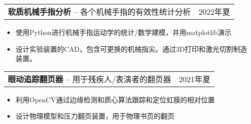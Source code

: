 \documentclass[oneside, 11pt]{article}
\newcommand*{\projectEntry}[3]{
	\noindent
	\begin{tabularx}{\textwidth}{Xr}
	\textbf{#1} -- #3 & #2
	\end{tabularx}
	\vspace{-1.25\baselineskip}
}
\newenvironment{expD}
	{\begin{itemize}[noitemsep,topsep=0pt]}
	{\end{itemize}}
\begin{document}
\projectEntry{软质机械手指分析}
  {2022年夏}
  {各个机械手指的有效性统计分析}

\begin{expD}
  \item 使用Python进行机械手指运动学的统计/数学建模，并用matplotlib演示
  \item 设计实验装置的CAD，包含可更换的机械指尖。通过3D打印和激光切割制造装置。
\end{expD}

\projectEntry{眼动追踪翻页器}
  {2021年夏}
  {用于残疾人/表演者的翻页器}

\begin{expD}
  \item 利用OpenCV通过边缘检测和质心算法跟踪和定位虹膜的相对位置
  \item 设计物理模型和压力翻页装置，用于物理书页的翻页
\end{expD}
\end{document}
